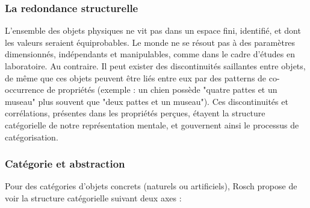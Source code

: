 \subsubsection{La redondance structurelle}

L'ensemble des objets physiques ne vit pas dans un espace fini, identifié, et dont les valeurs seraient équiprobables. Le monde ne se résout pas à des paramètres dimensionnés, indépendants et manipulables, comme dans le cadre d'études en laboratoire. Au contraire. Il peut exister des discontinuités saillantes entre objets, de même que ces objets peuvent être liés entre eux par des patterns de co-occurrence de propriétés (exemple : un chien possède "quatre pattes et un museau" plus souvent que "deux pattes et un museau"). Ces discontinuités et corrélations, présentes dans les propriétés perçues, étayent la structure catégorielle de notre représentation mentale, et gouvernent ainsi le processus de catégorisation.
 
\subsubsection{Catégorie et abstraction}
 \label{sec:ch3_categoEtAbstract}
 
Pour des catégories d'objets concrets (naturels ou artificiels), Rosch propose de voir la structure catégorielle suivant deux axes \citep[p. 30-41]{rosch1978cognition}:

